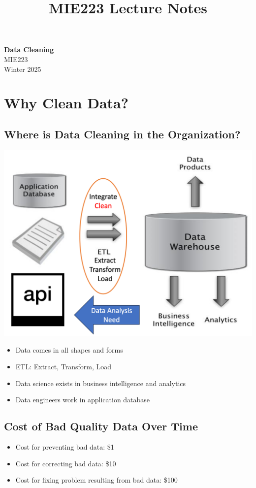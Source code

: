 \documentclass[11pt]{article}
\theoremstyle{definition}
\begin{document}
\setcounter{section}{0}
\title{MIE223 Lecture Notes}

\thispagestyle{empty}

\begin{center}
{\LARGE \bf Data Cleaning}\\
{\large MIE223}\\
Winter 2025
\end{center}

\section{Why Clean Data?}

\subsection{Where is Data Cleaning in the Organization?}
\includegraphics[width=\textwidth/2]{2.png}
\begin{itemize}
    \item Data comes in all shapes and forms
    \item ETL: Extract, Transform, Load
    \item Data science exists in business intelligence and analytics
    \item Data engineers work in application database
\end{itemize}

\subsection{Cost of Bad Quality Data Over Time}
\begin{itemize}
    \item Cost for preventing bad data: \$1
    \item Cost for correcting bad data: \$10
    \item Cost for fixing problem resulting from bad data: \$100
\end{itemize}
\end{document}
